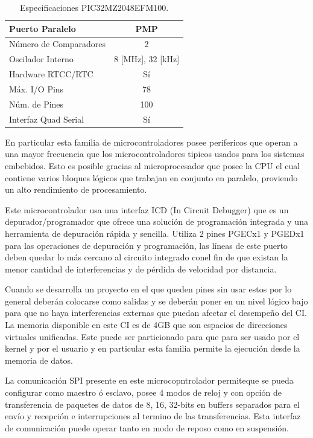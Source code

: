 \documentclass[letterpaper,12pt,oneside]{book}
\begin{document}
\begin{table}[!ht]
\begin{tabular}{ l | c }
					\hline
					Puerto Paralelo & PMP \\
					\hline
					Número de Comparadores & 2 \\
					\hline
					Oscilador Interno & 8 [MHz], 32 [kHz] \\
					\hline
					Hardware RTCC/RTC & Sí \\
					\hline
					Máx. I/O Pins & 78 \\
					\hline
					Núm. de Pines & 100 \\
					\hline
					Interfaz Quad Serial & Sí \\
				\end{tabular}
				\caption{Especificaciones PIC32MZ2048EFM100.}
				\label{EspPic32}
		\end{table}

		En particular esta familia de microcontroladores posee perifericos que operan a una mayor frecuencia que los microcontroladores tipicos usados para los sistemas embebidos. Esto es posible gracias al microprocesador que posee la CPU el cual contiene varios bloques lógicos que trabajan en conjunto en paralelo, proviendo un alto rendimiento de procesamiento.

		Este microcontrolador usa una interfaz ICD (In Circuit Debugger) que es un depurador/programador que ofrece una solución de programación integrada y una herramienta de depuración rápida y sencilla. Utiliza 2 pines PGECx1 y PGEDx1 para las operaciones de depuración y programación, las líneas de este puerto deben quedar lo más cercano al circuito integrado conel fin de que existan la menor cantidad de interferencias y de pérdida de velocidad por distancia.

		Cuando se desarrolla un proyecto en el que queden pines sin usar estos por lo general deberán colocarse como salidas y se deberán poner en un nivel lógico bajo para que no haya interferencias externas que puedan afectar el desempeño del CI. La memoria disponible en este CI es de 4GB que son espacios de direcciones virtuales unificadas. Este puede ser particionado para que para ser usado por el kernel y por el usuario y en particular esta familia permite la ejecución desde la memoria de datos.

		La comunicación SPI presente en este microcopntrolador permiteque se pueda configurar como maestro ó esclavo, posee 4 modos de reloj y con opción de transferencia de paquetes de datos de 8, 16, 32-bits en buffers separados para el envío y recepción e interrupciones al termino de las transferencias. Esta interfaz de comunicación puede operar tanto en modo de reposo como en suspensión.
\end{document}
